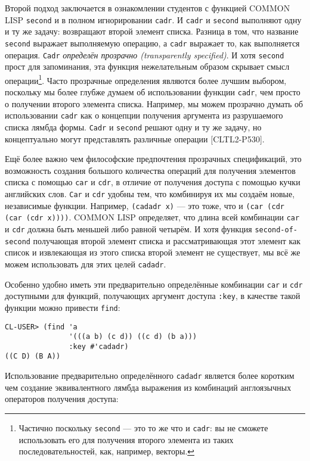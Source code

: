 Второй подход заключается в ознакомлении студентов с функцией COMMON LISP \verb"second" и в полном игнорировании \verb"cadr". И \verb"cadr" и \verb"second" выполняют одну и ту же задачу: возвращают второй элемент списка. Разница в том, что название \verb"second" выражает выполняемую операцию, а \verb"cadr" выражает то, как выполняется операция. \verb"Cadr" \emph{определён прозрачно (transparently specified)}. И хотя \verb"second" прост для запоминания, эта функция нежелательным образом скрывает смысл операции\footnote{Частично поскольку \verb"second" --- это то же что и \verb"cadr": вы не сможете использовать его для получения второго элемента из таких последовательностей, как, например, векторы.}. Часто прозрачные определения являются более лучшим выбором, поскольку мы более глубже думаем об использовании функции \verb"cadr", чем просто о получении второго элемента списка. Например, мы можем прозрачно думать об использовании \verb"cadr" как о концепции получения аргумента из разрушаемого списка лямбда формы. \verb"Cadr" и \verb"second" решают одну и ту же задачу, но концептуально могут представлять различные операции [CLTL2-P530].



Ещё более важно чем философские предпочтения прозрачных спецификаций, это возможность создания большого количества операций для получения элементов списка с помощью \verb"car" и \verb"cdr", в отличие от получения доступа с помощью кучки английских слов. \verb"Car" и \verb"cdr" удобны тем, что комбинируя их мы создаём новые, независимые функции. Например, \verb"(cadadr x)" --- это тоже, что и \verb"(car (cdr (car (cdr x))))". COMMON LISP определяет, что длина всей комбинации \verb"car" и \verb"cdr" должна быть меньшей либо равной четырём. И хотя функция \verb"second-of-second" получающая второй элемент списка и рассматривающая этот элемент как список и извлекающая из этого списка второй элемент не существует, мы всё же можем использовать для этих целей \verb"cadadr".

Особенно удобно иметь эти предварительно определённые комбинации \verb"car" и \verb"cdr" доступными для функций, получающих аргумент доступа \verb":key", в качестве такой функции можно привести \verb"find":

\begin{verbatim}
CL-USER> (find 'a
               '(((a b) (c d)) ((c d) (b a)))
               :key #'cadadr)
((C D) (B A))
\end{verbatim}

Использование предварительно определённого \verb"cadadr" является более коротким чем создание эквивалентного лямбда выражения из комбинаций англоязычных операторов получения доступа:

